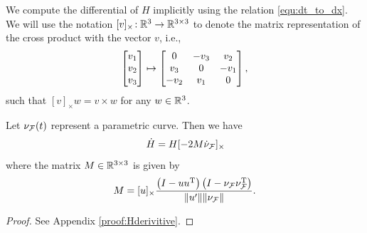 \documentclass[journal]{IEEEtran}  %
\begin{document}
  We compute the differential of $H$ implicitly using the relation \eqref{equ:dt_to_dx}. We will use the notation $[v]_{\times}\!:\mathbb{R}^{3}{}\to\mathbb{R}^{3\times 3}{}$ to denote the matrix representation of the cross product with the vector $v$, i.e.,
  \begin{equation}
    \begin{bmatrix}v_1\\v_2\\v_3\end{bmatrix}\mapsto \begin{bmatrix}0 & -v_3 &v_2\\v_3 & 0 & -v_1\\-v_2 & v_1 & 0\end{bmatrix},
  \end{equation}
  such that $[v]_\times w=v\times w$ for any $w\in\mathbb{R}^{3}{}$. %
  \begin{proposition}\label{prop:Hderivitive}
    Let $\nu_{\mathcal{F}}(t)$ represent a parametric curve. Then we have
    \begin{equation}
      \dot{H}=H[-2M\dot{\nu}_{\mathcal{F}}]_{\times}\!
    \end{equation}
    where the matrix $M\in\mathbb{R}^{3\times3}{}$ is given by
    \begin{equation}
      M=[u]_{\times}  \frac{ \left( I - u u^\mathrm{T} \right) \left( I- \nu_{\mathcal{F}} \nu_{\mathcal{F}}^\mathrm{T} \right)} {\lVert u'\rVert \lVert\nu_{\mathcal{F}}\rVert}.
    \end{equation}
  \end{proposition}
  \begin{proof}
  	See Appendix \ref{proof:Hderivitive}.
  \end{proof}
\end{document}
